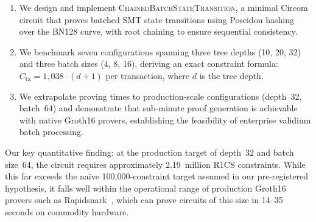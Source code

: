 \begin{enumerate}
\item We design and implement \textsc{ChainedBatchStateTransition}, a
  minimal Circom circuit that proves batched SMT state transitions
  using Poseidon hashing over the BN128 curve, with root chaining to
  ensure sequential consistency.

\item We benchmark seven configurations spanning three tree depths
  (10, 20, 32) and three batch sizes (4, 8, 16), deriving an exact
  constraint formula: $C_{\text{tx}} = 1{,}038 \cdot (d+1)$ per
  transaction, where $d$ is the tree depth.

\item We extrapolate proving times to production-scale configurations
  (depth~32, batch~64) and demonstrate that sub-minute proof generation
  is achievable with native Groth16 provers, establishing the feasibility
  of enterprise validium batch processing.
\end{enumerate}

Our key quantitative finding: at the production target of depth~32 and
batch size~64, the circuit requires approximately 2.19~million R1CS
constraints. While this far exceeds the na\"ive 100,000-constraint
target assumed in our pre-registered hypothesis, it falls well within the
operational range of production Groth16 provers such as
Rapidsnark~\cite{rapidsnark2024}, which can prove circuits of this size
in 14--35 seconds on commodity hardware.
